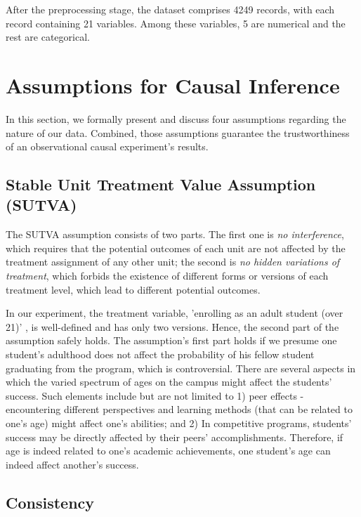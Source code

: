 \documentclass{article}
\newcommand{\todo}[1]{{\color{orange}{TODO: #1}}}
\newcommand{\gur}[1]{{\color{teal}{Gur: #1}}}
\begin{document}
\todo{scaling and encoding - I think that it can come later on in the analysis part, but don't forget!}

After the preprocessing stage, the dataset comprises 4249 records, with each record containing 21 variables. Among these variables, 5 are numerical and the rest are categorical.


\section{Assumptions for Causal Inference}\label{sec:assumptions}

In this section, we formally present and discuss four assumptions regarding the nature of our data. Combined, those assumptions guarantee the trustworthiness of an observational causal experiment's results.

\subsection{Stable Unit Treatment Value Assumption (SUTVA)}

The SUTVA assumption consists of two parts. The first one is \emph{no interference}, which requires that the potential outcomes of each unit are not affected by the treatment assignment of any other unit; the second is \emph{no hidden variations of treatment}, which forbids the existence of different forms or versions of each treatment level, which lead to different potential outcomes.

In our experiment, the treatment variable, 'enrolling as an adult student (over 21)' \gur{is it?}, is well-defined and has only two versions. Hence, the second part of the assumption safely holds. The assumption's first part holds if we presume one student's adulthood does not affect the probability of his fellow student graduating from the program, which is controversial. There are several aspects in which the varied spectrum of ages on the campus might affect the students' success. Such elements include but are not limited to 1) peer effects - encountering different perspectives and learning methods (that can be related to one's age) might affect one's abilities; and 2) In competitive programs, students' success may be directly affected by their peers' accomplishments. Therefore, if age is indeed related to one's academic achievements, one student's age can indeed affect another's success.

\subsection{Consistency}
\end{document}
